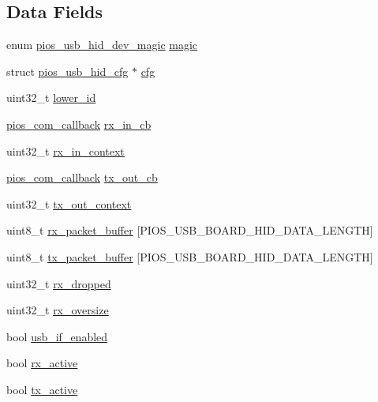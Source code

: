 \subsection*{\-Data \-Fields}
\begin{DoxyCompactItemize}
\item 
enum \hyperlink{group___p_i_o_s___u_s_b___h_i_d_ga7769ddfbb58cbf13d0e0662f4d441899}{pios\-\_\-usb\-\_\-hid\-\_\-dev\-\_\-magic} \hyperlink{group___p_i_o_s___u_s_b___h_i_d_ga31a2e7a6eac13138808d37592a55be4e}{magic}
\item 
struct \hyperlink{structpios__usb__hid__cfg}{pios\-\_\-usb\-\_\-hid\-\_\-cfg} $\ast$ \hyperlink{group___p_i_o_s___u_s_b___h_i_d_gaed58572b60b7d6cfa67fd0c4d66e882c}{cfg}
\item 
uint32\-\_\-t \hyperlink{group___p_i_o_s___u_s_b___h_i_d_ga088a37cd66d7047583d47a16a3381e4f}{lower\-\_\-id}
\item 
\hyperlink{group___p_i_o_s___c_o_m_ga23f1888821f1f74a50c02adc459df597}{pios\-\_\-com\-\_\-callback} \hyperlink{group___p_i_o_s___u_s_b___h_i_d_ga0d491f712337fdf9d08be6c72ac81094}{rx\-\_\-in\-\_\-cb}
\item 
uint32\-\_\-t \hyperlink{group___p_i_o_s___u_s_b___h_i_d_ga2ce875c5efa2b6b450f143818872513a}{rx\-\_\-in\-\_\-context}
\item 
\hyperlink{group___p_i_o_s___c_o_m_ga23f1888821f1f74a50c02adc459df597}{pios\-\_\-com\-\_\-callback} \hyperlink{group___p_i_o_s___u_s_b___h_i_d_ga04c76a0e0e88338371d2f12cd9749309}{tx\-\_\-out\-\_\-cb}
\item 
uint32\-\_\-t \hyperlink{group___p_i_o_s___u_s_b___h_i_d_ga1a95563a3fb1aee312d7793c77f81bf2}{tx\-\_\-out\-\_\-context}
\item 
uint8\-\_\-t \hyperlink{group___p_i_o_s___u_s_b___h_i_d_ga20fb92cd6b239abc72cb0ac8b93b11b4}{rx\-\_\-packet\-\_\-buffer} \mbox{[}\-P\-I\-O\-S\-\_\-\-U\-S\-B\-\_\-\-B\-O\-A\-R\-D\-\_\-\-H\-I\-D\-\_\-\-D\-A\-T\-A\-\_\-\-L\-E\-N\-G\-T\-H\mbox{]}
\item 
uint8\-\_\-t \hyperlink{group___p_i_o_s___u_s_b___h_i_d_gad6c7b8ecc0fe215e9d18d6d3281977c6}{tx\-\_\-packet\-\_\-buffer} \mbox{[}\-P\-I\-O\-S\-\_\-\-U\-S\-B\-\_\-\-B\-O\-A\-R\-D\-\_\-\-H\-I\-D\-\_\-\-D\-A\-T\-A\-\_\-\-L\-E\-N\-G\-T\-H\mbox{]}
\item 
uint32\-\_\-t \hyperlink{group___p_i_o_s___u_s_b___h_i_d_ga4ecf07921bfe18b2457b8d0c4c874990}{rx\-\_\-dropped}
\item 
uint32\-\_\-t \hyperlink{group___p_i_o_s___u_s_b___h_i_d_gaddc9bf1640b3a06aff88c4adaa6d3601}{rx\-\_\-oversize}
\item 
bool \hyperlink{group___p_i_o_s___u_s_b___h_i_d_ga545cdf4f2c93727b458fa26bf4426311}{usb\-\_\-if\-\_\-enabled}
\item 
bool \hyperlink{group___p_i_o_s___u_s_b___h_i_d_gaf4ed0035b90313acf78fada97b2ff2f5}{rx\-\_\-active}
\item 
bool \hyperlink{group___p_i_o_s___u_s_b___h_i_d_ga3c0deaac64c0f63bdb4a5cd41379bc23}{tx\-\_\-active}
\end{DoxyCompactItemize}


